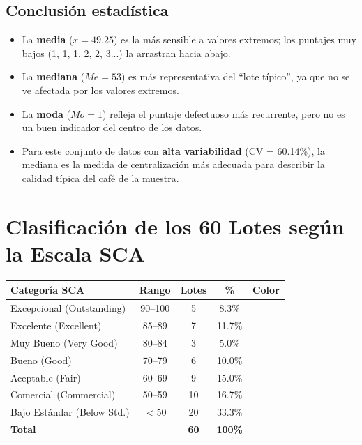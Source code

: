 \documentclass[12pt,a4paper]{article}
\begin{document}
\subsection{Conclusión estadística}

\begin{itemize}
  \item La \textbf{media} ($\bar{x} = 49.25$) es la más sensible a valores extremos; los puntajes muy bajos (1, 1, 1, 2, 2, 3...) la arrastran hacia abajo.
  \item La \textbf{mediana} ($Me = 53$) es más representativa del ``lote típico'', ya que no se ve afectada por los valores extremos.
  \item La \textbf{moda} ($Mo = 1$) refleja el puntaje defectuoso más recurrente, pero no es un buen indicador del centro de los datos.
  \item Para este conjunto de datos con \textbf{alta variabilidad} (CV = 60.14\%), la mediana es la medida de centralización más adecuada para describir la calidad típica del café de la muestra.
\end{itemize}

\section{Clasificación de los 60 Lotes según la Escala SCA}

\begin{center}
\begin{tabular}{lcccc}
\toprule
\textbf{Categoría SCA} & \textbf{Rango} & \textbf{Lotes} & \textbf{\%} & \textbf{Color} \\
\midrule
Excepcional (Outstanding)   & 90--100 & 5  & 8.3\%  & \cellcolor{green!60} \\
Excelente (Excellent)        & 85--89  & 7  & 11.7\% & \cellcolor{green!30} \\
Muy Bueno (Very Good)        & 80--84  & 3  & 5.0\%  & \cellcolor{yellow!60} \\
Bueno (Good)                 & 70--79  & 6  & 10.0\% & \cellcolor{yellow!30} \\
Aceptable (Fair)             & 60--69  & 9  & 15.0\% & \cellcolor{orange!30} \\
Comercial (Commercial)       & 50--59  & 10 & 16.7\% & \cellcolor{orange!60} \\
Bajo Estándar (Below Std.)   & $<50$   & 20 & 33.3\% & \cellcolor{red!30} \\
\midrule
\textbf{Total} & & \textbf{60} & \textbf{100\%} & \\
\bottomrule
\end{tabular}
\end{center}
\end{document}
